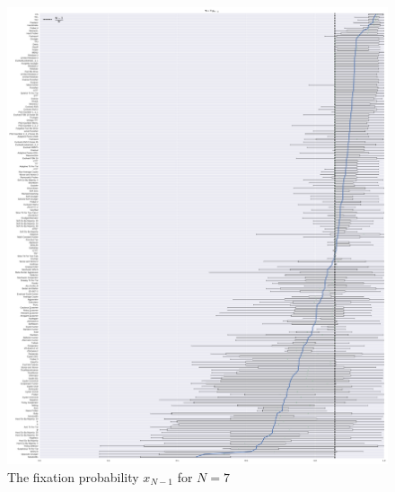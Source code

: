 \documentclass{article}
\begin{document}
\begin{figure}[!hbtp]
    \centering
    \includegraphics[height=.9\textheight]{./img/boxplot_7_resist.pdf}
    \caption{The fixation probability \(x_{N-1}\) for \(N=7\)}
    \label{fig:boxplot_6_resist}
\end{figure}
\end{document}
